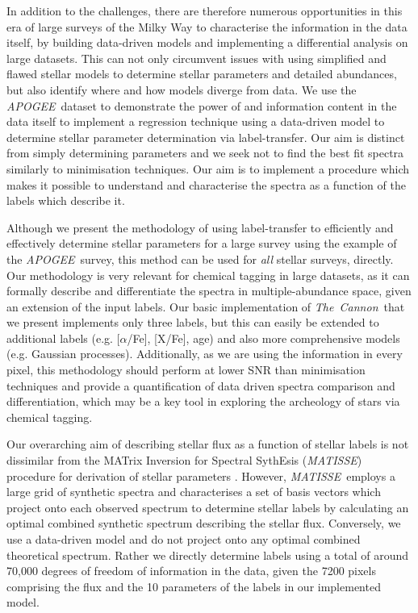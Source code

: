 \documentclass[12pt, preprint]{aastex}
\newcommand{\tc}{\textsl{The~Cannon}}
\newcommand{\apogee}{\textsl{APOGEE}}
\newcommand{\matisse}{\textsl{MATISSE}}
\begin{document}
In addition to the challenges, there are therefore numerous opportunities in this era of large surveys of the Milky Way to characterise the information in the data itself, by building data-driven models and implementing a differential analysis on large datasets. This can not only circumvent issues with using simplified and flawed stellar models to determine stellar parameters and detailed abundances, but also identify where and how models diverge from data. We use the \apogee\ dataset to demonstrate the power of and information content in the data itself to implement a regression technique using a data-driven model to determine stellar parameter determination via label-transfer. Our aim is distinct from simply determining parameters and we seek not to find the best fit spectra similarly to minimisation techniques. Our aim is to implement a procedure which makes it possible to understand and characterise the spectra as a function of the labels which describe it. 

Although we present the methodology of using label-transfer to efficiently and effectively determine stellar parameters for a large survey using the example of the \apogee\ survey, this method can be used for \textit{all} stellar surveys, directly.  Our methodology is very relevant for chemical tagging in large datasets, as it can formally describe and differentiate the spectra in multiple-abundance space, given an extension of the input labels.  Our basic implementation of \tc\ that we present implements only three labels, but this can easily be extended to additional labels  (e.g. [$\alpha$/Fe], [X/Fe], age) and also more comprehensive models (e.g. Gaussian processes). Additionally, as we are using the information in every pixel, this methodology should perform at lower SNR than minimisation techniques and provide a quantification of data driven spectra comparison and differentiation, which may be a key tool in exploring the archeology of stars via chemical tagging. 

Our overarching aim of describing stellar flux as a function of stellar labels is not dissimilar from the MATrix Inversion for Spectral SythEsis (\matisse) procedure for derivation of stellar parameters \citep{Reico-Blanco2006}. However, \matisse\ employs a large grid of synthetic spectra and characterises a set of basis vectors which project onto each observed spectrum to determine stellar labels by calculating an optimal combined synthetic spectrum describing the stellar flux. Conversely, we use a data-driven model and do not project onto any optimal combined theoretical spectrum. Rather we directly determine labels using a total of around 70,000 degrees of freedom of information in the data, given the 7200 pixels comprising the flux and the 10 parameters of the labels in our implemented model. 
\end{document}
